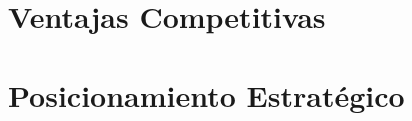 \section{Ventajas Competitivas}
\label{sec:ventajas-competitivas}

\section{Posicionamiento Estratégico}
\label{sec:posicionamiento}
